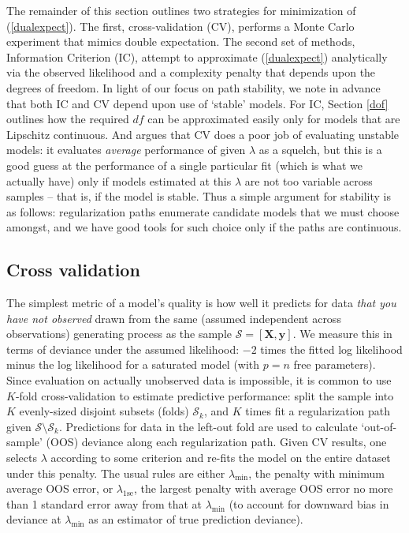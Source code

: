 \documentclass[12pt]{article}
\newcommand{\mc}[1]{\mathcal{#1}}
\newcommand{\mr}[1]{\mathrm{#1}}
\newcommand{\bm}[1]{\mathbf{#1}}
\begin{document}
The remainder of this section outlines two strategies for minimization of (\ref{dualexpect}).  The first, cross-validation (CV), performs a Monte Carlo experiment that mimics double expectation.  The second set of methods, Information Criterion (IC), attempt to approximate (\ref{dualexpect}) analytically via the observed likelihood and a complexity penalty that depends upon the degrees of freedom.
In light of our focus on path stability, we note in advance that  both IC and CV depend upon use of `stable'
models. For IC, Section \ref{dof} outlines how the required $df$ can be
approximated easily only for models that are Lipschitz continuous.  And
\citet{breiman_heuristics_1996} argues that CV does a poor job of evaluating
unstable models: it evaluates  {\it average} performance of given $\lambda$
as a squelch, but this is a good guess at the
performance of a single particular fit (which is what we actually have)  only
if models estimated at this $\lambda$ are not too variable across samples --
that is, if the model is stable.  Thus a simple argument for stability is as
follows: regularization paths enumerate candidate models that we must choose
amongst, and we have good tools for such choice only if the paths are
continuous.


\subsection{Cross validation}

The simplest metric of a model's quality is how well it predicts for data {\it
that you have not observed} drawn from the same (assumed independent across
observations) generating process as the sample $\mc{S} = [\bm{X},\bm{y}]$.  We
measure this in terms of deviance under the assumed likelihood: $-2$ times the
fitted log likelihood minus the log likelihood for a saturated model (with
$p=n$ free parameters).  Since evaluation on actually unobserved data is
impossible, it is common to use $K$-fold cross-validation \cite[CV; see][for
an overview]{efron_estimation_2004} to estimate  predictive performance: split
the sample into $K$  evenly-sized disjoint subsets (folds) $\mc{S}_k$,  and
$K$ times fit a regularization path given $\mc{S} \setminus \mc{S}_k$.
Predictions for data in the left-out fold are  used to calculate `out-of-
sample' (OOS) deviance   along each regularization path. Given CV results, one
selects $\lambda$ according to some criterion and re-fits the model on the
entire dataset under this penalty.  The usual rules are either
$\lambda_{\mr{min}}$, the penalty with minimum average OOS error, or
$\lambda_{1\mr{se}}$, the largest penalty with average OOS error no more than
1 standard error away from that at $\lambda_{\mr{min}}$ (to account for
downward bias in deviance at $\lambda_{\mr{min}}$ as an estimator of true
prediction deviance).
\end{document}
